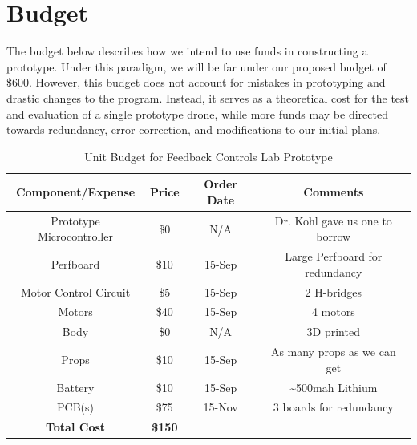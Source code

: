 \documentclass[12pt, titlepage]{article}
\begin{document}
\section{Budget}
The budget below describes how we intend to use funds in constructing a prototype. Under this paradigm, we will be far under our proposed budget of \$600. However, this budget does not account for mistakes in prototyping and drastic changes to the program. Instead, it serves as a theoretical cost for the test and evaluation of a single prototype drone, while more funds may be directed towards redundancy, error correction, and modifications to our initial plans.
\begin{table}[h!]
\centering
\caption{Unit Budget for Feedback Controls Lab Prototype}
\label{tab:budget}
\begin{tabular}{||c|c|c|c||}
\hline 
\hline
\textbf{Component/Expense} & \textbf{Price} & \textbf{Order Date} & \textbf{Comments} \\ 
\hline 
Prototype Microcontroller & \$0 & N/A & Dr. Kohl gave us one to borrow \\
\hline 
Perfboard & \$10 & 15-Sep & Large Perfboard for redundancy \\ 
\hline 
Motor Control Circuit & \$5 & 15-Sep & 2 H-bridges \\ 
\hline 
Motors & \$40 & 15-Sep & 4 motors \\ 
\hline 
Body & \$0 & N/A & 3D printed \\ 
\hline 
Props & \$10 & 15-Sep & As many props as we can get \\ 
\hline 
Battery & \$10 & 15-Sep & \textasciitilde 500mah Lithium \\ 
\hline 
PCB(s) & \$75 & 15-Nov & 3 boards for redundancy \\ 
\hline 
\textbf{Total Cost} & \textbf{\$150} &  &  \\ 
\hline 
\hline
\end{tabular} 
\end{table}
\end{document}
